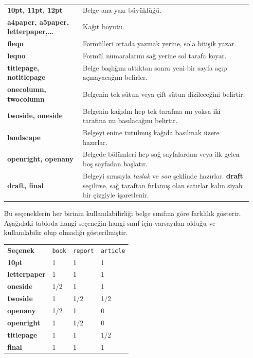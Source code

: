 \documentclass[
  10pt,
]{scrbook}
\begin{document}
\begin{longtable}[]{@{}ll@{}}
\toprule
\endhead
\textbf{10pt, 11pt, 12pt} & Belge ana yazı büyüklüğü. \\
\textbf{a4paper, a5paper, letterpaper,\ldots{}} & Kağıt boyutu. \\
\textbf{fleqn} & Formülleri ortada yazmak yerine, sola bitişik yazar. \\
\textbf{leqno} & Formül numaralarını sağ yerine sol tarafa koyar. \\
\textbf{titlepage, notitlepage} & Belge başlığını attıktan sonra yeni bir sayfa açıp açmayacağını belirler. \\
\textbf{onecolumn, twocolumn} & Belgenin tek sütun veya çift sütun dizileceğini belirtir. \\
\textbf{twoside, oneside} & Belgenin kağıdın hep tek tarafına mı yoksa iki tarafına mı basılacağını belirtir. \\
\textbf{landscape} & Belgeyi enine tutulmuş kağıda basılmak üzere hazırlar. \\
\textbf{openright, openany} & Belgede bölümleri hep sağ sayfalardan veya ilk gelen boş sayfadan başlatır. \\
\textbf{draft, final} & Belgeyi sırasıyla \emph{taslak} ve \emph{son} şeklinde hazırlar. \textbf{draft} seçilirse, sağ taraftan fırlamış olan satırlar kalın siyah bir çizgiyle işaretlenir. \\
\bottomrule
\end{longtable}

Bu seçeneklerin her birinin kullanılabilirliği belge sınıfına göre
farklılık gösterir. Aşağıdaki tabloda hangi seçeneğin hangi sınıf için
varsayılan olduğu ve kullanılabilir olup olmadığı gösterilmiştir.

\begin{longtable}[]{@{}llll@{}}
\toprule
\endhead
\textbf{Seçenek} & \texttt{book} & \texttt{report} & \texttt{article} \\
\textbf{10pt} & 1 & 1 & 1 \\
\textbf{letterpaper} & 1 & 1 & 1 \\
\textbf{oneside} & 1/2 & 1 & 1 \\
\textbf{twoside} & 1 & 1/2 & 1/2 \\
\textbf{openany} & 1/2 & 1 & 0 \\
\textbf{openright} & 1 & 1/2 & 0 \\
\textbf{titlepage} & 1 & 1 & 1/2 \\
\textbf{final} & 1 & 1 & 1 \\
\bottomrule
\end{longtable}
\end{document}
